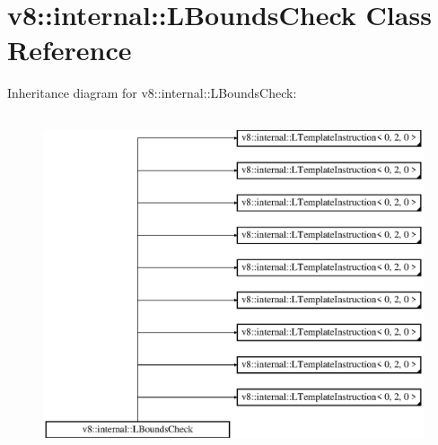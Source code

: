 \hypertarget{classv8_1_1internal_1_1_l_bounds_check}{}\section{v8\+:\+:internal\+:\+:L\+Bounds\+Check Class Reference}
\label{classv8_1_1internal_1_1_l_bounds_check}
Inheritance diagram for v8\+:\+:internal\+:\+:L\+Bounds\+Check\+:\begin{figure}[H]
\begin{center}
\leavevmode
\includegraphics[height=10.000000cm]{classv8_1_1internal_1_1_l_bounds_check}
\end{center}
\end{figure}
